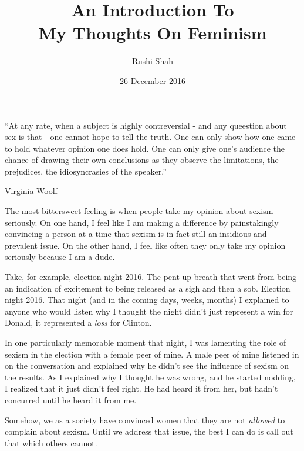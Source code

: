 \documentclass{article}
\author{Rushi Shah}
\date{26 December 2016}
\title{An Introduction To \\ My Thoughts On Feminism}
\begin{document}
\maketitle

	\epigraph{``At any rate, when a subject is highly contreversial - and any queestion about sex is that - one cannot hope to tell the truth. One can only show how one came to hold whatever opinion one does hold. One can only give one's audience the chance of drawing their own conclusions as they observe the limitations, the prejudices, the idiosyncrasies of the speaker.''}{Virginia Woolf}

	The most bittersweet feeling is when people take my opinion about sexism seriously. On one hand, I feel like I am making a difference by painstakingly convincing a person at a time that sexism is in fact still an insidious and prevalent issue. On the other hand, I feel like often they only take my opinion seriously because I am a dude. 

	Take, for example, election night 2016. The pent-up breath that went from being an indication of excitement to being released as a sigh and then a sob. Election night 2016. That night (and in the coming days, weeks, months) I explained to anyone who would listen why I thought the night didn't just represent a win for Donald, it represented a \textit{loss} for Clinton.


	In one particularly memorable moment that night, I was lamenting the role of sexism in the election with a female peer of mine. A male peer of mine listened in on the conversation and explained why he didn't see the influence of sexism on the results. As I explained why I thought he was wrong, and he started nodding, I realized that it just didn't feel right. He had heard it from her, but hadn't concurred until he heard it from me. 

	Somehow, we as a society have convinced women that they are not \textit{allowed} to complain about sexism. Until we address that issue, the best I can do is call out that which others cannot. 



\end{document}
